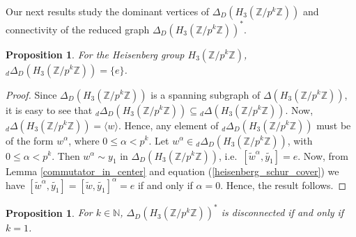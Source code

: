 \documentclass[12pt,a4paper]{article}
\newtheorem{proposition}[theorem]{Proposition}
\begin{document}
Our next results study the dominant vertices of $\Delta_D(H_3(\mathbb{Z}/p^k\mathbb{Z}))$ and connectivity of the reduced graph $\Delta_D(H_3(\mathbb{Z}/p^k\mathbb{Z}))^*$. 
\begin{proposition}\label{dominant_heisenberg}
For the Heisenberg group $H_3(\mathbb{Z}/p^k\mathbb{Z})$, ${_d}\Delta_D(H_3(\mathbb{Z}/p^k\mathbb{Z}))=\{e\}$.    
\end{proposition}
\begin{proof}
Since $\Delta_D(H_3(\mathbb{Z}/p^k\mathbb{Z}))$ is a spanning subgraph of $\Delta(H_3(\mathbb{Z}/p^k\mathbb{Z}))$, it is easy to see that ${_d}\Delta_D(H_3(\mathbb{Z}/p^k\mathbb{Z}))\subseteq{_d}\Delta(H_3(\mathbb{Z}/p^k\mathbb{Z}))$. Now, ${_d}\Delta(H_3(\mathbb{Z}/p^k\mathbb{Z}))=\langle w\rangle$. Hence, any element of ${_d}\Delta_D(H_3(\mathbb{Z}/p^k\mathbb{Z}))$ must be of the form $w^\alpha$, where $0\leq \alpha<p^k$. Let $w^\alpha\in{_d}\Delta_D(H_3(\mathbb{Z}/p^k\mathbb{Z}))$, with $0\leq \alpha<p^k$. Then $w^\alpha\sim y_1$ in $\Delta_D(H_3(\mathbb{Z}/p^k\mathbb{Z}))$, i.e.~$[\tilde{w}^\alpha,\tilde{y_1}]=e$. Now, from Lemma \ref{commutator_in_center} and equation (\ref{heisenberg_schur_cover}) we have $[\tilde{w}^\alpha,\tilde{y_1}]=[\tilde{w},\tilde{y_1}]^\alpha=e$ if and only if $\alpha=0$. Hence, the result follows. 
\end{proof}
\begin{proposition}\label{connectivity_heisenberg}
For $k\in\mathbb{N}$, $\Delta_D(H_3(\mathbb{Z}/p^k\mathbb{Z}))^*$ is disconnected if and only if $k=1$.  
\end{proposition}
\end{document}
